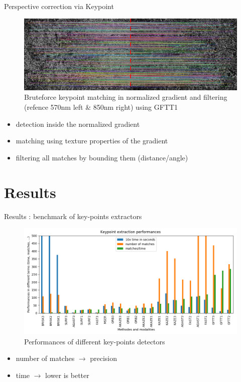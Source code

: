 \documentclass{beamer}
\begin{document}
		\begin{frame}{Perspective correction via Keypoint}
			\begin{figure}
				\includegraphics[width=\linewidth]{../figures/prespective-feature-matching}
				\caption{Bruteforce keypoint matching in normalized gradient and filtering (refence 570nm left \& 850nm right) using GFTT1}
			\end{figure}
		
			\begin{itemize}
				\item detection inside the normalized gradient
				\item matching using texture properties of the gradient
				\item filtering all matches by bounding them (distance/angle)
			\end{itemize}
		\end{frame}
	
	\section{Results}
	
		\begin{frame}{Results : benchmark of key-points extractors}
			\begin{figure}
				\includegraphics[width=\linewidth]{../figures/comparaison-keypoint-performances}
				\caption{Performances of different key-points detectors}
			\end{figure}
			\vspace{-1em}
			\begin{itemize}
				\item number of matches $\rightarrow$ precision
				\item time $\rightarrow$ lower is better
			\end{itemize}
		\end{frame}
	
\end{document}
